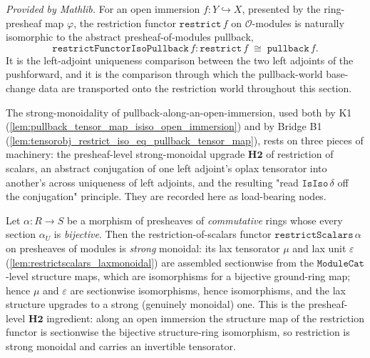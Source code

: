 \begin{definition}
  \label{def:restrictfunctorisopullback}
  \mathlibok
  \textit{Provided by Mathlib.}
  For an open immersion \(f : Y \hookrightarrow X\), presented by the ring-presheaf map
  \(\varphi\), the restriction functor \(\mathtt{restrict}\,f\) on \(\mathcal{O}\)-modules is
  naturally isomorphic to the abstract presheaf-of-modules pullback,
  \[
    \mathtt{restrictFunctorIsoPullback}\,f :
      \mathtt{restrict}\,f \;\cong\; \mathtt{pullback}\,f .
  \]
  It is the left-adjoint uniqueness comparison between the two left adjoints of the
  pushforward, and it is the comparison through which the pullback-world base-change data are
  transported onto the restriction world throughout this section.
\end{definition}

The strong-monoidality of pullback-along-an-open-immersion, used both by K1
(\cref{lem:pullback_tensor_map_isiso_open_immersion}) and by Bridge B1
(\cref{lem:tensorobj_restrict_iso_eq_pullback_tensor_map}), rests on three pieces of machinery: the
presheaf-level strong-monoidal upgrade \(\mathbf{H2}\) of restriction of scalars, an abstract
conjugation of one left adjoint's oplax tensorator into another's across uniqueness of left
adjoints, and the resulting "read \(\mathtt{IsIso}\,\delta\) off the conjugation" principle. They are
recorded here as load-bearing nodes.

\begin{lemma}\leanok
  \label{lem:restrictscalars_monoidal_of_bijective}
  Let \(\alpha : R \to S\) be a morphism of presheaves of \emph{commutative} rings whose every
  section \(\alpha_U\) is \emph{bijective}. Then the restriction-of-scalars functor
  \(\mathtt{restrictScalars}\,\alpha\) on presheaves of modules is \emph{strong} monoidal: its lax
  tensorator \(\mu\) and lax unit \(\varepsilon\) (\cref{lem:restrictscalars_laxmonoidal}) are
  assembled sectionwise from the \(\mathtt{ModuleCat}\)-level structure maps, which are isomorphisms
  for a bijective ground-ring map; hence \(\mu\) and \(\varepsilon\) are sectionwise isomorphisms,
  hence isomorphisms, and the lax structure upgrades to a strong (genuinely monoidal) one. This is
  the presheaf-level \(\mathbf{H2}\) ingredient: along an open immersion the structure map of the
  restriction functor is sectionwise the bijective structure-ring isomorphism, so restriction is
  strong monoidal and carries an invertible tensorator.
\end{lemma}

